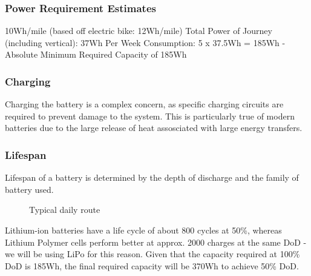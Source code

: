 \documentclass[journal,10pt]{IEEEtran}
\begin{document}
        \subsubsection{Power Requirement Estimates}
            10Wh/mile (based off electric bike: 12Wh/mile)
            Total Power of Journey (including vertical): 37Wh
            Per Week Consumption: 5 x 37.5Wh = 185Wh
            -Absolute Minimum Required Capacity of 185Wh
        \subsubsection{Charging}
            Charging the battery is a complex concern, as specific charging circuits are required to prevent damage to the system. This is particularly true of modern batteries due to the large release of heat assosciated with large energy transfers.
        \subsubsection{Lifespan}
            Lifespan of a battery is determined by the depth of discharge and the family of battery used.
            \begin{figure}[H]
                \centering
                \caption{Typical daily route}
                \label{fig:route}
            \end{figure}
            Lithium-ion batteries have a life cycle of about 800 cycles at 50\%, whereas Lithium Polymer cells perform better at approx. 2000 charges at the same DoD - we will be using LiPo for this reason. Given that the capacity required at 100\% DoD is 185Wh, the final required capacity will be 370Wh to achieve 50\% DoD.
\end{document}
